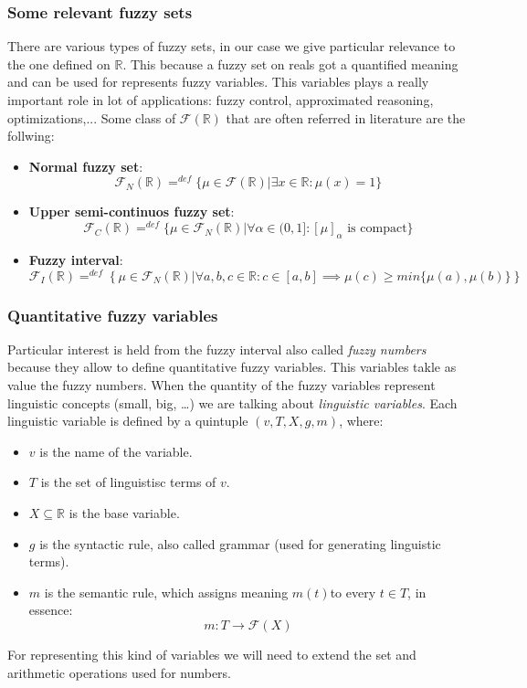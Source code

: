 \documentclass{article}
\begin{document}
\subsubsection{Some relevant fuzzy sets}
There are various types of fuzzy sets, in our case we give particular relevance to the one
defined on $\mathbb{R}$. This because a fuzzy set on reals got a quantified meaning and can be
used for represents fuzzy variables. This variables plays a really important role in lot of
applications: fuzzy control, approximated reasoning, optimizations,...
Some class of $\mathcal{F}(\mathbb{R})$ that are often referred in literature are the follwing:
\begin{itemize}
    \item \textbf{Normal fuzzy set}:
          $$\mathcal{F}_N(\mathbb{R})=^{def} \{\mu\in\mathcal{F}(\mathbb{R})|\exists x\in\mathbb{R}:\mu(x)=1 \}$$
    \item \textbf{Upper semi-continuos fuzzy set}:
          $$\mathcal{F}_C(\mathbb{R})=^{def} \{\mu\in\mathcal{F}_N(\mathbb{R})| \forall\alpha\in (0,1]:[\mu]_\alpha \text{ is compact}\}$$
    \item \textbf{Fuzzy interval}:
          $$\mathcal{F}_I(\mathbb{R})=^{def}\left\{\mu\in\mathcal{F}_N(\mathbb{R})|\forall a,b,c \in\mathbb{R}:c\in [a,b]\implies \mu(c)\geq min\{\mu(a),\mu(b)\}\right\}$$

\end{itemize}


\subsubsection{Quantitative fuzzy variables}
Particular interest is held from the fuzzy interval also called \textit{fuzzy numbers} because they allow
to define quantitative fuzzy variables. This variables takle as value the fuzzy numbers. When the
quantity of the fuzzy variables represent linguistic concepts (small, big, \dots) we are talking
about \textit{linguistic variables}. Each linguistic variable is defined by a quintuple $(v, T,X,g,m)$,
where:
\begin{itemize}
    \item $v$ is the name of the variable.
    \item $T$ is the set of linguistisc terms of $v$.
    \item $X\subseteq\mathbb{R}$ is the base variable.
    \item $g$ is the syntactic rule, also called grammar (used for generating linguistic terms).
    \item $m$ is the semantic rule, which assigns meaning $m(t)$to every $t\in T$, in essence:
          $$m:T\rightarrow\mathcal{F}(X)$$
\end{itemize}
For representing this kind of variables we will need to extend the set and arithmetic operations
used for numbers.
\end{document}
